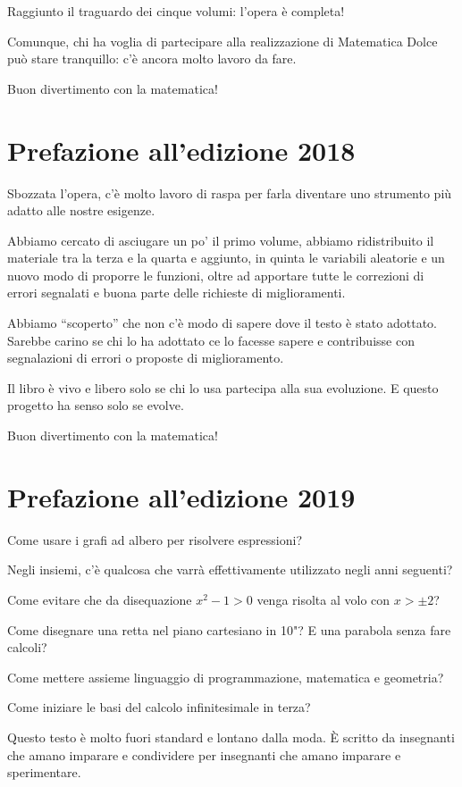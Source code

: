 Raggiunto il traguardo dei cinque volumi: l'opera è completa!

Comunque, chi ha voglia di partecipare alla realizzazione di Matematica Dolce 
può stare tranquillo: 
c'è ancora molto lavoro da fare.

Buon divertimento con la matematica!

\section{Prefazione all'edizione 2018}

Sbozzata l'opera, c'è molto lavoro di raspa per farla diventare uno 
strumento più adatto alle nostre esigenze.

Abbiamo cercato di asciugare un po' il primo volume, abbiamo ridistribuito 
il materiale tra la terza e la quarta e aggiunto, in quinta le variabili 
aleatorie e un nuovo modo di proporre le funzioni,
oltre ad apportare tutte le correzioni di errori segnalati e buona parte 
delle richieste di miglioramenti.

Abbiamo ``scoperto'' che non c'è modo di sapere dove il testo è stato 
adottato. Sarebbe carino se chi lo ha adottato ce lo facesse sapere e 
contribuisse con segnalazioni di errori o proposte di miglioramento.

Il libro è vivo e libero solo se chi lo usa partecipa alla sua evoluzione.
E questo progetto ha senso solo se evolve.

Buon divertimento con la matematica!

\section{Prefazione all'edizione 2019}

Come usare i grafi ad albero per risolvere espressioni?

Negli insiemi, c'è qualcosa che varrà effettivamente utilizzato negli anni 
seguenti? 

Come evitare che da disequazione \(x^2-1>0\) venga risolta al volo con 
\(x>\pm 2\)?

Come disegnare una retta nel piano cartesiano in 10"? E una parabola senza 
fare calcoli?

Come mettere assieme linguaggio di programmazione, matematica e geometria?

Come iniziare le basi del calcolo infinitesimale in terza?

Questo testo è molto fuori standard e lontano dalla moda. È scritto da 
insegnanti che amano imparare e condividere per insegnanti che amano 
imparare e sperimentare.

